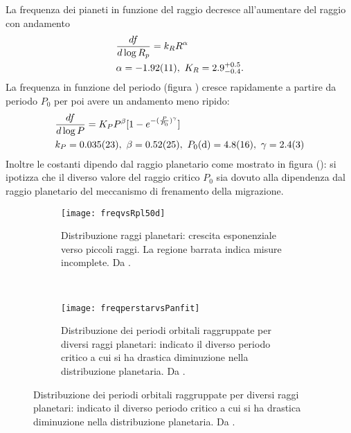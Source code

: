 La frequenza dei pianeti in funzione del raggio decresce all'aumentare del raggio con andamento
\begin{equation}
\begin{aligned}
&\TDy{\log{R_p}}{f}=k_RR\expy{\alpha}\\
&\alpha=\num{-1.92+-0.11},\ K_R=2.9_{-0.4}^{+0.5}.
\end{aligned}
\end{equation}
La frequenza in funzione del periodo (figura ) cresce rapidamente a partire da periodo $P_0$ per poi avere un andamento meno ripido:
\begin{equation}
\begin{aligned}
&\TDy{\log{P}}{f}=K_PP\expy{\beta}[1-\exp{-(\frac{P}{P_0})\expy{\gamma}}]\\
&k_P=\num{0.035+-0.023},\ \beta=\num{0.52+-0.25},\ P_0(\si{\day})=\num{4.8+-1.6},\ \gamma=\num{2.4+-0.3}
\end{aligned}
\end{equation}
Inoltre le costanti dipendo dal raggio planetario come mostrato in figura (): si ipotizza che il diverso valore del raggio critico $P_0$ sia dovuto alla dipendenza dal raggio planetario del meccanismo di frenamento della migrazione.

\begin{figure}[!ht]
	\begin{subfigure}[b]{0.47\textwidth}
		\centering
		\texttt{[image: freqvsRpl50d]}
		\caption{Distribuzione raggi planetari: crescita esponenziale verso piccoli raggi. La regione barrata indica misure incomplete. Da \cite{howard2012planet}.}\label{fig:howard2012planet}
	\end{subfigure}
	~
	\begin{subfigure}[b]{0.5\textwidth} \centering
		\texttt{[image: freqperstarvsPanfit]}
		\caption{Distribuzione dei periodi orbitali raggruppate per diversi raggi planetari: indicato il diverso periodo critico a cui si ha drastica diminuzione nella distribuzione planetaria. Da \cite{howard2012planet}.}\label{fig:freqperstarvsPanfit}
	\end{subfigure}
\end{figure}

